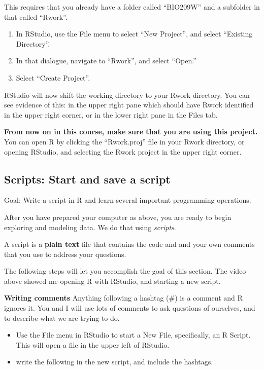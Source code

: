 \documentclass[
  letterpaper,
  DIV=11,
  numbers=noendperiod]{scrreprt}
\providecommand{\tightlist}{%
  \setlength{\itemsep}{0pt}\setlength{\parskip}{0pt}}
\begin{document}
This requires that you already have a folder called ``BIO209W'' and a
subfolder in that called ``Rwork''.

\begin{enumerate}
\def\labelenumi{\arabic{enumi}.}
\tightlist
\item
  In RStudio, use the File menu to select ``New Project'', and select
  ``Existing Directory''.
\item
  In that dialogue, navigate to ``Rwork'', and select ``Open.''
\item
  Select ``Create Project''.
\end{enumerate}

RStudio will now shift the working directory to your Rwork directory.
You can see evidence of this: in the upper right pane which should have
Rwork identified in the upper right corner, or in the lower right pane
in the Files tab.

\textbf{From now on in this course, make sure that you are using this
project.} You can open R by clicking the ``Rwork.proj'' file in your
Rwork directory, or opening RStudio, and selecting the Rwork project in
the upper right corner.

\subsection{Scripts: Start and save a
script}\label{scripts-start-and-save-a-script}

Goal: Write a script in R and learn several important programming
operations.

After you have prepared your computer as above, you are ready to begin
exploring and modeling data. We do that using \emph{scripts}.

A script is a \textbf{plain text} file that contains the code and and
your own comments that you use to address your questions.

The following steps will let you accomplish the goal of this section.
The video above showed me opening R with RStudio, and starting a new
script.

\textbf{Writing comments} Anything following a hashtag (\#) is a comment
and R ignores it. You and I will use lots of comments to ask questions
of ourselves, and to describe what we are trying to do.

\begin{itemize}
\tightlist
\item
  Use the File menu in RStudio to start a New File, specifically, an R
  Script. This will open a file in the upper left of RStudio.
\item
  write the following in the new script, and include the hashtags.
\end{itemize}
\end{document}
